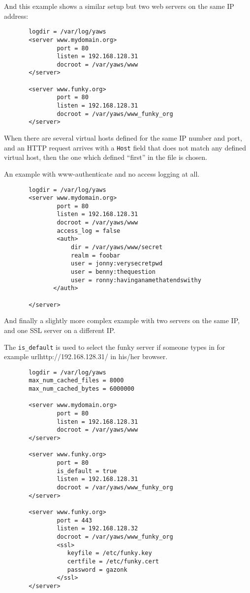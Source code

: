\documentclass[11pt,oneside,english]{book}
\begin{document}
       And this example shows a similar setup but two web
       servers on the same IP address:

\begin{verbatim}
       logdir = /var/log/yaws
       <server www.mydomain.org>
               port = 80
               listen = 192.168.128.31
               docroot = /var/yaws/www
       </server>

       <server www.funky.org>
               port = 80
               listen = 192.168.128.31
               docroot = /var/yaws/www_funky_org
       </server>
\end{verbatim}


When there are several virtual hosts defined for the same IP number
and port, and an HTTP request arrives with a \verb+Host+ field that
does not match any defined virtual host, then the one which defined
``first'' in the file is chosen.

An example with www-authenticate and no access logging at all.

\begin{verbatim}
       logdir = /var/log/yaws
       <server www.mydomain.org>
               port = 80
               listen = 192.168.128.31
               docroot = /var/yaws/www
               access_log = false
               <auth>
                   dir = /var/yaws/www/secret
                   realm = foobar
                   user = jonny:verysecretpwd
                   user = benny:thequestion
                   user = ronny:havinganamethatendswithy
              </auth>

       </server>
\end{verbatim}

       And  finally  a  slightly more complex example with
       two servers on the same IP, and one SSL server on a
       different IP.

       The \verb+is_default+ is used to select the funky server if
       someone types in for example url{http://192.168.128.31/} in
       his\slash her browser.


\begin{verbatim}
       logdir = /var/log/yaws
       max_num_cached_files = 8000
       max_num_cached_bytes = 6000000

       <server www.mydomain.org>
               port = 80
               listen = 192.168.128.31
               docroot = /var/yaws/www
       </server>

       <server www.funky.org>
               port = 80
               is_default = true
               listen = 192.168.128.31
               docroot = /var/yaws/www_funky_org
       </server>

       <server www.funky.org>
               port = 443
               listen = 192.168.128.32
               docroot = /var/yaws/www_funky_org
               <ssl>
                  keyfile = /etc/funky.key
                  certfile = /etc/funky.cert
                  password = gazonk
               </ssl>
       </server>
\end{verbatim}
\end{document}
